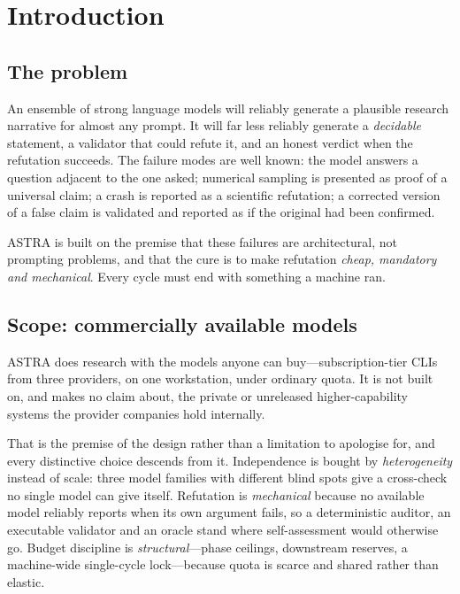\documentclass[11pt,a4paper]{article}
\begin{document}
\section{Introduction}

\subsection{The problem}

An ensemble of strong language models will reliably generate a plausible
research narrative for almost any prompt. It will far less reliably generate a
\emph{decidable} statement, a validator that could refute it, and an honest
verdict when the refutation succeeds. The failure modes are well known: the
model answers a question adjacent to the one asked; numerical sampling is
presented as proof of a universal claim; a crash is reported as a scientific
refutation; a corrected version of a false claim is validated and reported as if
the original had been confirmed.

ASTRA is built on the premise that these failures are architectural, not
prompting problems, and that the cure is to make refutation \emph{cheap,
mandatory and mechanical}. Every cycle must end with something a machine ran.

\subsection{Scope: commercially available models}
\label{sec:scope}

ASTRA does research with the models anyone can buy---subscription-tier CLIs from
three providers, on one workstation, under ordinary quota. It is not built on,
and makes no claim about, the private or unreleased higher-capability systems
the provider companies hold internally.

That is the premise of the design rather than a limitation to apologise for, and
every distinctive choice descends from it. Independence is bought by
\emph{heterogeneity} instead of scale: three model families with different blind
spots give a cross-check no single model can give itself. Refutation is
\emph{mechanical} because no available model reliably reports when its own
argument fails, so a deterministic auditor, an executable validator and an
oracle stand where self-assessment would otherwise go. Budget discipline is
\emph{structural}---phase ceilings, downstream reserves, a machine-wide
single-cycle lock---because quota is scarce and shared rather than elastic.
\end{document}
